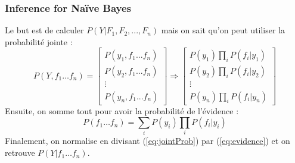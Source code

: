 \subsubsection{Inference for Naïve Bayes}
Le but est de calculer $P(Y|F_1, F_2, ..., F_n)$ mais on sait qu'on peut utiliser la probabilité jointe :
\begin{equation}
    P(Y,f_1\dots f_n) =
    \begin{bmatrix}
        P(y_1,f_1...f_n)\\
        P(y_2,f_1...f_n)\\
        \vdots\\
        P(y_n,f_1...f_n)
    \end{bmatrix}
    \Rightarrow
    \begin{bmatrix}
        P(y_1)\prod_{i} P(f_i|y_1)\\
        P(y_2)\prod_{i} P(f_i|y_2)\\
        \vdots\\
        P(y_n)\prod_{i} P(f_i|y_n)
    \end{bmatrix}   
\label{eq:jointProb}
\end{equation}
Ensuite, on somme tout pour avoir la probabilité de l'évidence :
\begin{equation}
    P(f_1\dots f_n) = \sum_{i} P(y_i)\prod_{i} P(f_i|y_i)
\label{eq:evidence}
\end{equation}
Finalement, on normalise en divisant (\ref{eq:jointProb}) par (\ref{eq:evidence}) et on retrouve $P(Y|f_1\dots f_n)$.